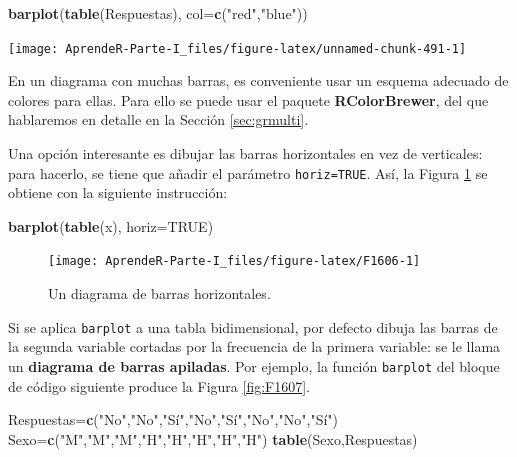 \documentclass[]{book}
\newenvironment{Shaded}{\begin{snugshade}}{\end{snugshade}}
\newcommand{\DataTypeTok}[1]{\textcolor[rgb]{0.13,0.29,0.53}{#1}}
\newcommand{\KeywordTok}[1]{\textcolor[rgb]{0.13,0.29,0.53}{\textbf{#1}}}
\newcommand{\NormalTok}[1]{#1}
\newcommand{\OtherTok}[1]{\textcolor[rgb]{0.56,0.35,0.01}{#1}}
\newcommand{\StringTok}[1]{\textcolor[rgb]{0.31,0.60,0.02}{#1}}
\theoremstyle{definition}
\theoremstyle{definition}
\theoremstyle{definition}
\theoremstyle{remark}
\begin{document}
\begin{Shaded}
\begin{Highlighting}[]
\KeywordTok{barplot}\NormalTok{(}\KeywordTok{table}\NormalTok{(Respuestas), }\DataTypeTok{col=}\KeywordTok{c}\NormalTok{(}\StringTok{"red"}\NormalTok{,}\StringTok{"blue"}\NormalTok{))}
\end{Highlighting}
\end{Shaded}

\begin{center}\texttt{[image: AprendeR-Parte-I\_files/figure-latex/unnamed-chunk-491-1]} \end{center}

En un diagrama con muchas barras, es conveniente usar un esquema adecuado de colores para ellas. Para ello se puede usar el paquete \textbf{RColorBrewer}, del que hablaremos en detalle en la Sección \ref{sec:grmulti}.

Una opción interesante es dibujar las barras horizontales en vez de verticales: para hacerlo, se tiene que añadir el parámetro \texttt{horiz=TRUE}. Así, la Figura \ref{fig:F1606} se obtiene con la siguiente instrucción:

\begin{Shaded}
\begin{Highlighting}[]
\KeywordTok{barplot}\NormalTok{(}\KeywordTok{table}\NormalTok{(x), }\DataTypeTok{horiz=}\OtherTok{TRUE}\NormalTok{)}
\end{Highlighting}
\end{Shaded}

\begin{figure}

{\centering \texttt{[image: AprendeR-Parte-I\_files/figure-latex/F1606-1]} 

}

\caption{Un diagrama de barras horizontales.}\label{fig:F1606}
\end{figure}

Si se aplica \texttt{barplot} a una tabla bidimensional, por defecto dibuja las barras de la segunda variable cortadas por la frecuencia de la primera variable: se le llama un \textbf{diagrama de barras apiladas}. Por ejemplo, la función \texttt{barplot} del bloque de código siguiente produce la Figura \ref{fig:F1607}.

\begin{Shaded}
\begin{Highlighting}[]
\NormalTok{Respuestas=}\KeywordTok{c}\NormalTok{(}\StringTok{"No"}\NormalTok{,}\StringTok{"No"}\NormalTok{,}\StringTok{"Sí"}\NormalTok{,}\StringTok{"No"}\NormalTok{,}\StringTok{"Sí"}\NormalTok{,}\StringTok{"No"}\NormalTok{,}\StringTok{"No"}\NormalTok{,}\StringTok{"Sí"}\NormalTok{)}
\NormalTok{Sexo=}\KeywordTok{c}\NormalTok{(}\StringTok{"M"}\NormalTok{,}\StringTok{"M"}\NormalTok{,}\StringTok{"M"}\NormalTok{,}\StringTok{"H"}\NormalTok{,}\StringTok{"H"}\NormalTok{,}\StringTok{"H"}\NormalTok{,}\StringTok{"H"}\NormalTok{,}\StringTok{"H"}\NormalTok{)}
\KeywordTok{table}\NormalTok{(Sexo,Respuestas)}
\end{Highlighting}
\end{Shaded}
\end{document}
